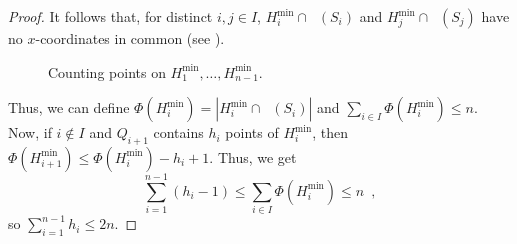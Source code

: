 \documentclass{patmorin}
\DeclareMathOperator{\survivors}{\overline\kappa}
\begin{document}
\begin{proof}
   It follows that, for distinct $i,j\in I$, $H^{\min}_i\cap
   \survivors(S_i)$ and $H^{\min}_j\cap\survivors(S_j)$ have no
   $x$-coordinates in common (see ).
   \begin{figure}
      \caption{Counting points on $H^{\min}_1,\ldots,H^{\min}_{n-1}$.}
   \end{figure}
   Thus, we can define $\Phi(H^{\min}_i)=|H^{\min}_i\cap \survivors(S_i)|$
   and $\sum_{i\in I}\Phi(H^{\min}_i)\le n$. Now, if $i\not\in I$
   and $Q_{i+1}$ contains $h_i$ points of $H^{\min}_i$,
   then $\Phi(H^{\min}_{i+1}) \le \Phi(H^{\min}_i) - h_i + 1$.  Thus, we get
   \[
      \sum_{i=1}^{n-1}(h_i-1) \le \sum_{i\in I}\Phi(H^{\min}_i) \le n \enspace ,
   \]
   so $\sum_{i=1}^{n-1}h_i \le 2n$.


\end{proof}
\end{document}
